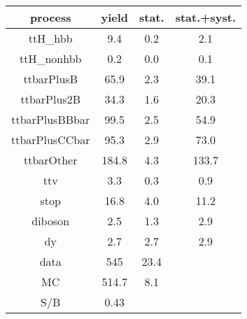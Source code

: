 \begin{tabular}{cccc}
\hline
    process     &  yield  &  stat.  &  stat.+syst.  \\
\hline
    ttH\_hbb     &   9.4   &   0.2   &      2.1      \\
   ttH\_nonhbb   &   0.2   &   0.0   &      0.1      \\
   ttbarPlusB   &  65.9   &   2.3   &     39.1      \\
  ttbarPlus2B   &  34.3   &   1.6   &     20.3      \\
 ttbarPlusBBbar &  99.5   &   2.5   &     54.9      \\
 ttbarPlusCCbar &  95.3   &   2.9   &     73.0      \\
   ttbarOther   &  184.8  &   4.3   &     133.7     \\
      ttv       &   3.3   &   0.3   &      0.9      \\
      stop      &  16.8   &   4.0   &     11.2      \\
    diboson     &   2.5   &   1.3   &      2.9      \\
       dy       &   2.7   &   2.7   &      2.9      \\
      data      &   545   &  23.4   &               \\
       MC       &  514.7  &   8.1   &               \\
      S/B       &  0.43   &         &               \\
\hline
\end{tabular}